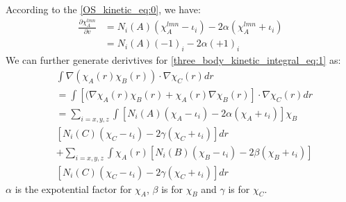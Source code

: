 According to the \ref{OS_kinetic_eq:0}, we have:
\begin{align}
 \frac{\partial \chi^{lmn}_{A}}{\partial v} &= 
 N_{i}(A)(\chi_{A}^{lmn}-\iota_{i}) - 2\alpha(\chi_{A}^{lmn}+\iota_{i}) \nonumber \\
 &= N_{i}(A)(-1)_{i} - 2\alpha(+1)_{i}
 \label{three_body_kinetic_integral_eq:2}
\end{align}
We can further generate derivtives for \ref{three_body_kinetic_integral_eq:1}
as:
\begin{equation}
 \begin{split}
&\int \nabla(\chi_{A}(r)\chi_{B}(r)) \cdot \nabla\chi_{C}(r) dr \\
&= \int \left[ (\nabla\chi_{A}(r)\chi_{B}(r) + \chi_{A}(r)\nabla\chi_{B}(r)\right] 
\cdot \nabla\chi_{C}(r) dr \\
&= \sum_{i = x, y, z} \int
[ N_{i}(A)(\chi_{A}-\iota_{i}) - 2\alpha(\chi_{A}+\iota_{i})] \chi_{B} \\
&[ N_{i}(C)(\chi_{C}-\iota_{i}) - 2\gamma(\chi_{C}+\iota_{i})] dr \\
&+ \sum_{i = x, y, z} \int 
\chi_{A}(r) \left[ 
N_{i}(B)(\chi_{B}-\iota_{i}) - 2\beta(\chi_{B}+\iota_{i})\right] \\
&\left[ N_{i}(C)(\chi_{C}-\iota_{i}) - 2\gamma(\chi_{C}+\iota_{i})\right]  dr
 \end{split}
\label{three_body_kinetic_integral_eq:3}
\end{equation}
$\alpha$ is the expotential factor for $\chi_{A}$, $\beta$ is for $\chi_{B}$
and $\gamma$ is for $\chi_{C}$.

